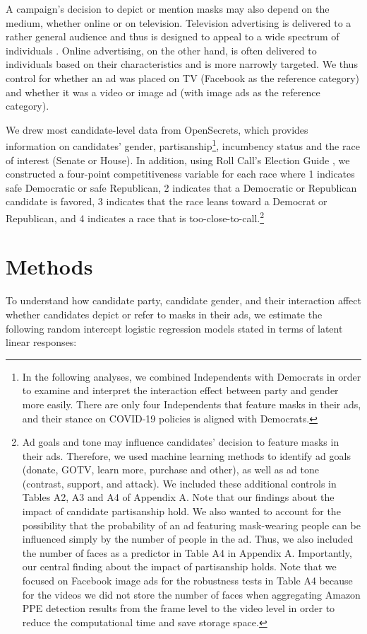 A campaign's decision to depict or mention masks may also depend on the medium, whether online or on television. Television advertising is delivered to a rather general audience and thus is designed to appeal to a wide spectrum of individuals \parencite{fowler2021political}.  Online advertising, on the other hand, is often delivered to individuals based on their characteristics and is more narrowly targeted.  We thus control for whether an ad was placed on TV (Facebook as the reference category) and whether it was a video or image ad (with image ads as the reference category). 

We drew most candidate-level data from OpenSecrets, which provides information on candidates' gender, partisanship\footnote{In the following analyses, we combined Independents with Democrats in order to examine and interpret the interaction effect between party and gender more easily. There are only four Independents that feature masks in their ads, and their stance on COVID-19 policies is aligned with Democrats.}, incumbency status and the race of interest (Senate or House).  In addition, using Roll Call's Election Guide \parencite{rollcall2020}, we constructed a four-point competitiveness variable for each race where 1 indicates safe Democratic or safe Republican, 2 indicates that a Democratic or Republican candidate is favored, 3 indicates that the race leans toward a Democrat or Republican, and 4 indicates a race that is too-close-to-call.\footnote{Ad goals and tone may influence candidates' decision to feature masks in their ads. Therefore, we used machine learning methods to identify ad goals (donate, GOTV, learn more, purchase and other), as well as ad tone (contrast, support, and attack). We included these additional controls in Tables A2, A3 and A4 of Appendix A. Note that our findings about the impact of candidate partisanship hold. We also wanted to account for the possibility that the probability of an ad featuring mask-wearing people can be influenced simply by the number of people in the ad.  Thus, we also included the number of faces as a predictor in Table A4 in Appendix A. Importantly, our central finding about the impact of partisanship holds. Note that we focused on Facebook image ads for the robustness tests in Table A4 because for the videos we did not store the number of faces when aggregating Amazon PPE detection results from the frame level to the video level in order to reduce the computational time and save storage space.} 

\section*{Methods}
To understand how candidate party, candidate gender, and their interaction affect whether candidates depict or refer to masks in their ads, we estimate the following random intercept logistic regression models stated in terms of latent linear responses:

